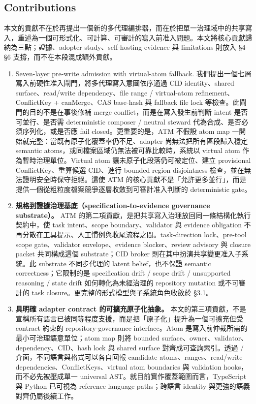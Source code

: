 \documentclass[a4paper,fontset=none]{ctexart}
\begin{document}
\subsection{Contributions}

本文的貢獻不在於再提出一個新的多代理編排器，而在於把單一治理域中的共享寫入，重述為一個可形式化、可計算、可審計的寫入前准入問題。本文將核心貢獻歸納為三點；證據、adopter study、self-hosting evidence 與 limitations 則放入 §4-§6 支撐，而不在本段混成額外貢獻。

\begin{enumerate}
\item Seven-layer pre-write admission with virtual-atom fallback. 我們提出一個七層寫入前硬性准入閘門，將多代理寫入意圖依序通過 CID identity、shared surface、read/write dependency、file range / virtual-atom refinement、ConflictKey + canMerge、CAS base-hash 與 fallback file lock 等檢查。此閘門的目的不是在事後修補 merge conflict，而是在寫入發生前判斷 intent 是否可並行、是否需 deterministic composer / neutral steward 代為合成、是否必須序列化，或是否應 fail closed。更重要的是，ATM 不假設 atom map 一開始就完整：當既有原子化覆蓋率仍不足、adapter 尚無法把所有區段歸入穩定 semantic atoms，或同檔案區域仍無法被可靠比較時，系統以 virtual atom 作為暫時治理單位。Virtual atom 讓未原子化段落仍可被定位、建立 provisional ConflictKey、重算候選 CID、進行 bounded-region disjointness 檢查，並在無法證明安全時保守拒絕。這使 ATM 的核心貢獻不是「允許更多並行」，而是提供一個從粗粒度檔案競爭逐層收斂到可審計准入判斷的 deterministic gate。
\item \textbf{規格到證據治理基底（specification-to-evidence governance substrate）。} ATM 的第二項貢獻，是把共享寫入治理放回同一條結構化執行契約中，使 task intent、scope boundary、validator 與 evidence obligation 不再分散在工具提示、人工慣例與收尾流程之間。task-direction lock、pre-tool scope gate、validator envelope、evidence blocker、review advisory 與 closure packet 共同構成這個 substrate；CID broker 則在其中扮演共享變更准入子系統。此 substrate 不同步代理的 latent belief，也不保證 semantic correctness；它限制的是 specification drift / scope drift / unsupported reasoning / state drift 如何轉化為未經治理的 repository mutation 或不可審計的 task closure。更完整的形式模型與子系統角色收斂於 §3.1。
\item \textbf{具明確 adapter contract 的可擴充原子化抽象。} 本文的第三項貢獻，不是宣稱所有語言已被同等程度支援，而是把「原子化」提升為一個可擴充但受 contract 約束的 repository-governance interface。Atom 是寫入前仲裁所需的最小可治理語意單位；atom map 則將 bounded surface、owner、validator、dependency、CID、hash lock 與 shared surface 對齊成可查詢索引。透過 \texttt{} / \texttt{} 介面，不同語言與格式可以各自回報 candidate atoms、ranges、read/write dependencies、ConflictKeys、virtual atom boundaries 與 validation hooks，而不必先被壓成單一 universal AST。就目前實作覆蓋範圍而言，TypeScript 與 Python 已可視為 reference language paths；跨語言 identity 與更強的語義對齊仍屬後續工作。
\end{enumerate}
\end{document}
